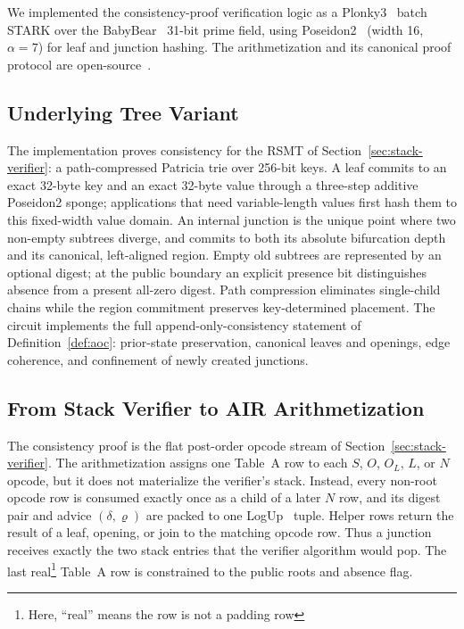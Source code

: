 \documentclass[twocolumn]{article}
\begin{document}
We implemented the consistency-proof verification logic as a Plonky3~\cite{plonky3} batch STARK over the BabyBear~\cite{babybear} 31-bit prime field, using Poseidon2~\cite{cryptoeprint:2023/323} (width 16, $\alpha=7$) for leaf and junction hashing. The arithmetization and its canonical proof protocol are open-source~\cite{rsmtair}.

\subsection{Underlying Tree Variant}

The implementation proves consistency for the RSMT of Section~\ref{sec:stack-verifier}: a path-compressed Patricia trie over 256-bit keys. A leaf commits to an exact 32-byte key and an exact 32-byte value through a three-step additive Poseidon2 sponge; applications that need variable-length values first hash them to this fixed-width value domain. An internal junction is the unique point where two non-empty subtrees diverge, and commits to both its absolute bifurcation depth and its canonical, left-aligned region. Empty old subtrees are represented by an optional digest; at the public boundary an explicit presence bit distinguishes absence from a present all-zero digest. Path compression eliminates single-child chains while the region commitment preserves key-determined placement. The circuit implements the full append-only-consistency statement of Definition~\ref{def:aoc}: prior-state preservation, canonical leaves and openings, edge coherence, and confinement of newly created junctions.

\subsection{From Stack Verifier to AIR Arithmetization}

The consistency proof is the flat post-order opcode stream of Section~\ref{sec:stack-verifier}. The arithmetization assigns one Table~A row to each $S$, $O$, $O_L$, $L$, or $N$ opcode, but it does not materialize the verifier's stack. Instead, every non-root opcode row is consumed exactly once as a child of a later $N$ row, and its digest pair and advice $(\delta,\varrho)$ are packed to one LogUp~\cite{cryptoeprint:2022/1530} tuple. Helper rows return the result of a leaf, opening, or join to the matching opcode row. Thus a junction receives exactly the two stack entries that the verifier algorithm would pop. The last real\footnote{Here, ``real'' means the row is not a padding row} Table~A row is constrained to the public roots and absence flag.
\end{document}
